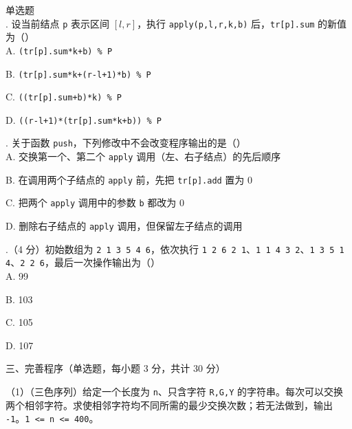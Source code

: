 \documentclass[a4paper]{ctexart}
\newcommand{\wdot}{{\fontsize{12}{12}\selectfont\textbullet}}
\newcommand{\bigtitle}[1]{\noindent\heiti #1\par\vspace{2pt}}
\newcommand{\q}[1]{\noindent #1}
\newcommand{\opt}[1]{\hspace*{2em} #1\par}
\begin{document}
\noindent\wdot\hspace{0.5em}单选题\\
\q{30.} 设当前结点 \texttt{p} 表示区间 \([l,r]\)，执行 \texttt{apply(p,l,r,k,b)} 后，\texttt{tr[p].sum} 的新值为（\qquad）\\
\opt{A. \texttt{(tr[p].sum*k+b) \% P}}
\opt{B. \texttt{(tr[p].sum*k+(r-l+1)*b) \% P}}
\opt{C. \texttt{((tr[p].sum+b)*k) \% P}}
\opt{D. \texttt{((r-l+1)*(tr[p].sum*k+b)) \% P}}
\q{31.} 关于函数 \texttt{push}，下列修改中不会改变程序输出的是（\qquad）\\
\opt{A. 交换第一个、第二个 \texttt{apply} 调用（左、右子结点）的先后顺序}
\opt{B. 在调用两个子结点的 \texttt{apply} 前，先把 \texttt{tr[p].add} 置为 0}
\opt{C. 把两个 \texttt{apply} 调用中的参数 \texttt{b} 都改为 0}
\opt{D. 删除右子结点的 \texttt{apply} 调用，但保留左子结点的调用}
\q{32.}（4 分）初始数组为 \texttt{2 1 3 5 4 6}，依次执行 \texttt{1 2 6 2 1}、\texttt{1 1 4 3 2}、\texttt{1 3 5 1 4}、\texttt{2 2 6}，最后一次操作输出为（\qquad）\\
\opt{A. 99}\opt{B. 103}\opt{C. 105}\opt{D. 107}
\clearpage
\bigtitle{三、完善程序（单选题，每小题 3 分，共计 30 分）}

\noindent（1）（三色序列）给定一个长度为 \texttt{n}、只含字符 \texttt{R,G,Y} 的字符串。每次可以交换两个相邻字符。求使相邻字符均不同所需的最少交换次数；若无法做到，输出 \texttt{-1}。\texttt{1 <= n <= 400}。
\end{document}
